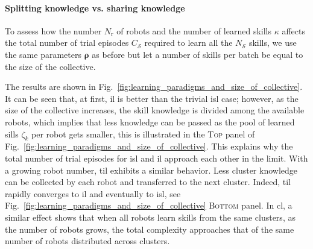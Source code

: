 \documentclass[12pt]{article}
\newcommand*{\pending}[1]{\textcolor{blue}{$\bigstar$~\textbf{PENDING~#1}}}
\begin{document}
\paragraph*{Splitting knowledge vs. sharing knowledge}
To assess how the number $N_\mathrm{r}$ of robots and the number of learned skills $\kappa$ affects the total number of trial episodes $C_\mathcal{S}$ required to learn all the $N_\mathcal{S}$ skills, we use the same parameters $\bm{\rho}$ as before but let a number of skills per batch be equal to the size of the collective.

The results are shown in Fig.~\ref{fig:learning_paradigms_and_size_of_collective}. It can be seen that, at first, \ac{il} is better than the trivial \ac{isl} case; however, as the size of the collective increases, the skill knowledge is divided among the available robots, which implies that less knowledge can be passed as the pool of learned sills $\zeta_k$ per robot gets smaller, this is illustrated in the \textsc{Top} panel of Fig.~\ref{fig:learning_paradigms_and_size_of_collective}. This explains why the total number of trial episodes for \ac{isl} and \ac{il} approach each other in the limit. With a growing robot number, \ac{til} exhibits a similar behavior. Less cluster knowledge can be collected by each robot and transferred to the next cluster. Indeed, \ac{til} rapidly converges to \ac{il} and eventually to \ac{isl}, see Fig.~\ref{fig:learning_paradigms_and_size_of_collective} \textsc{Bottom} panel. In \ac{cl}, a similar effect shows that when all robots learn skills from the same clusters, as the number of robots grows, the total complexity approaches that of the same number of robots distributed across clusters.
\end{document}
